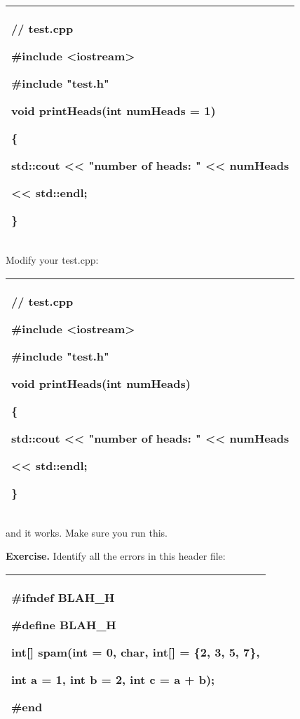 \documentclass[
]{article}
\begin{document}
\begin{longtable}[]{@{}l@{}}
\toprule
\endhead
\begin{minipage}[t]{0.97\columnwidth}\raggedright
// test.cpp

\#include \textless iostream\textgreater{}

\#include "test.h"

void printHeads(int numHeads = 1)

\{

std::cout \textless\textless{} "number of heads: " \textless\textless{}
numHeads

\textless\textless{} std::endl;

\}\strut
\end{minipage}\tabularnewline
\bottomrule
\end{longtable}

Modify your test.cpp:

\begin{longtable}[]{@{}l@{}}
\toprule
\endhead
\begin{minipage}[t]{0.97\columnwidth}\raggedright
// test.cpp

\#include \textless iostream\textgreater{}

\#include "test.h"

void printHeads(int numHeads)

\{

std::cout \textless\textless{} "number of heads: " \textless\textless{}
numHeads

\textless\textless{} std::endl;

\}\strut
\end{minipage}\tabularnewline
\bottomrule
\end{longtable}

and it works. Make sure you run this.

\textbf{Exercise.} Identify all the errors in this header file:

\begin{longtable}[]{@{}l@{}}
\toprule
\endhead
\begin{minipage}[t]{0.97\columnwidth}\raggedright
\#ifndef BLAH\_H

\#define BLAH\_H

int{[}{]} spam(int = 0, char, int{[}{]} = \{2, 3, 5, 7\},

int a = 1, int b = 2, int c = a + b);

\#end\strut
\end{minipage}\tabularnewline
\bottomrule
\end{longtable}
\end{document}
